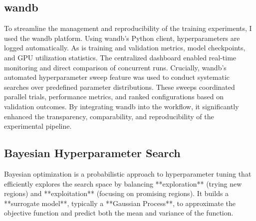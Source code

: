 
\subsection{\acrfull{wandb}}
\label{ssec:wandb}
To streamline the management and reproducibility of the training experiments, I used the \acrlong{wandb} platform. Using \acrshort{wandb}’s Python client, hyperparameters are logged automatically. As is training and validation metrics, model checkpoints, and GPU utilization statistics. The centralized dashboard enabled real-time monitoring and direct comparison of concurrent runs. Crucially, \acrshort{wandb}’s automated hyperparameter sweep feature was used to conduct systematic searches over predefined parameter distributions. These sweeps coordinated parallel trials, performance metrics, and ranked configurations based on validation outcomes. By integrating \acrshort{wandb} into the workflow, it significantly enhanced the transparency, comparability, and reproducibility of the experimental pipeline.

\subsection{Bayesian Hyperparameter Search}

Bayesian optimization is a probabilistic approach to hyperparameter tuning that efficiently explores the search space by balancing **exploration** (trying new regions) and **exploitation** (focusing on promising regions). It builds a **surrogate model**, typically a **Gaussian Process**, to approximate the objective function and predict both the mean and variance of the function.

